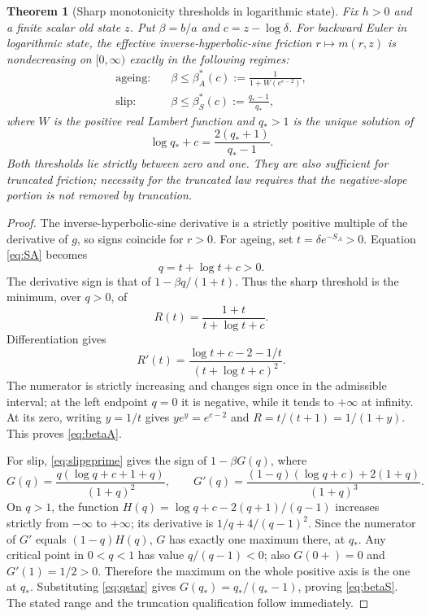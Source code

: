 \documentclass[11pt,a4paper]{article}
\newtheorem{theorem}{Theorem}[section]
\theoremstyle{definition}\newtheorem{definition}[theorem]{Definition}
\theoremstyle{remark}\newtheorem{remark}[theorem]{Remark}
\numberwithin{equation}{section}
\begin{document}
\begin{theorem}[Sharp monotonicity thresholds in logarithmic state]\label{thm:thresholds}
Fix $h>0$ and a finite scalar old state $z$. Put $\beta=b/a$ and $c=z-\log\delta$. For backward Euler in logarithmic state, the effective inverse-hyperbolic-sine friction $r\mapsto m(r,z)$ is nondecreasing on $[0,\infty)$ exactly in the following regimes:
\begin{align}
 \text{ageing:}\quad &\beta\le\beta_A^*(c)
 :=\frac1{1+W(e^{c-2})},\label{eq:betaA}\\
 \text{slip:}\quad &\beta\le\beta_S^*(c)
 :=\frac{q_*-1}{q_*},\label{eq:betaS}
\end{align}
where $W$ is the positive real Lambert function and $q_*>1$ is the unique solution of
\begin{equation}\label{eq:qstar}
 \log q_*+c=\frac{2(q_*+1)}{q_*-1}.
\end{equation}
Both thresholds lie strictly between zero and one. They are also sufficient for truncated friction; necessity for the truncated law requires that the negative-slope portion is not removed by truncation.
\end{theorem}
\begin{proof}
The inverse-hyperbolic-sine derivative is a strictly positive multiple of the derivative of $g$, so signs coincide for $r>0$.
For ageing, set $t=\delta e^{-S_A}>0$. Equation \eqref{eq:SA} becomes
\[
 q=t+\log t+c>0.
\]
The derivative sign is that of $1-\beta q/(1+t)$. Thus the sharp threshold is the minimum, over $q>0$, of
\[
 R(t)=\frac{1+t}{t+\log t+c}.
\]
Differentiation gives
\[
 R'(t)=\frac{\log t+c-2-1/t}{(t+\log t+c)^2}.
\]
The numerator is strictly increasing and changes sign once in the admissible interval; at the left endpoint $q=0$ it is negative, while it tends to $+\infty$ at infinity. At its zero, writing $y=1/t$ gives $y e^y=e^{c-2}$ and $R=t/(t+1)=1/(1+y)$. This proves \eqref{eq:betaA}.

For slip, \eqref{eq:slipgprime} gives the sign of $1-\beta G(q)$, where
\[
 G(q)=\frac{q(\log q+c+1+q)}{(1+q)^2},\qquad
 G'(q)=\frac{(1-q)(\log q+c)+2(1+q)}{(1+q)^3}.
\]
On $q>1$, the function
$H(q)=\log q+c-2(q+1)/(q-1)$ increases strictly from $-\infty$ to $+\infty$; its derivative is $1/q+4/(q-1)^2$. Since the numerator of $G'$ equals $(1-q)H(q)$, $G$ has exactly one maximum there, at $q_*$. Any critical point in $0<q<1$ has value $q/(q-1)<0$; also $G(0+)=0$ and $G'(1)=1/2>0$. Therefore the maximum on the whole positive axis is the one at $q_*$. Substituting \eqref{eq:qstar} gives $G(q_*)=q_*/(q_*-1)$, proving \eqref{eq:betaS}. The stated range and the truncation qualification follow immediately.
\end{proof}
\end{document}
